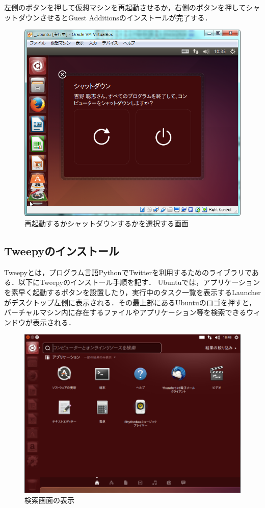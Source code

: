 左側のボタンを押して仮想マシンを再起動させるか，右側のボタンを押してシャットダウンさせるとGuest Additionsのインストールが完了する．

\begin{figure}[H]
\centering
\includegraphics[width=13cm]{ubuntushutdown_choose.PNG}
\caption{再起動するかシャットダウンするかを選択する画面}\label{ubuntushutdownchoose}
\end{figure}

\subsection{Tweepyのインストール}
Tweepyとは，プログラム言語PythonでTwitterを利用するためのライブラリである．以下にTweepyのインストール手順を記す．
Ubuntuでは，アプリケーションを素早く起動するボタンを設置したり，実行中のタスク一覧を表示するLauncherがデスクトップ左側に表示される．その最上部にあるUbuntuのロゴを押すと，バーチャルマシン内に存在するファイルやアプリケーション等を検索できるウィンドウが表示される．

\begin{figure}[H]
\centering
\includegraphics[width=13cm]{super1.PNG}
\caption{検索画面の表示}\label{super1}
\end{figure}


